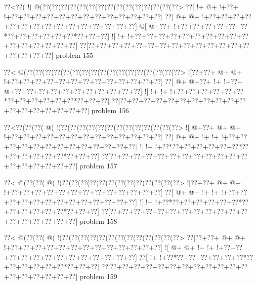 \vbox{\vbox{\goo
\0??<\0??(\- !(\- @(\0??(\0??(\0??(\0??(\0??(\0??(\0??(\0??(\0??(\0??(\0??(\0??(\0??(\0??(\0??>
\0??[\- !+\- @+\- !+\0??+\- !+\0??+\0??+\0??+\0??+\0??+\0??+\0??+\0??+\0??+\0??+\0??+\0??+\0??]
\0??[\- @+\- @+\- !+\0??+\0??+\0??+\0??+\0??+\0??+\0??+\0??+\0??+\0??+\0??+\0??+\0??+\0??+\0??]
\- @[\- @+\0??+\- !+\0??+\0??+\0??+\0??+\0??+\0??*\0??+\0??+\0??+\0??+\0??+\0??*\0??+\0??+\0??]
\- ![\- !+\- !+\0??+\0??+\0??+\0??+\0??+\0??+\0??+\0??+\0??+\0??+\0??+\0??+\0??+\0??+\0??+\0??]
\0??[\0??+\0??+\0??+\0??+\0??+\0??+\0??+\0??+\0??+\0??+\0??+\0??+\0??+\0??+\0??+\0??+\0??+\0??]
}
\hfil problem 155\hfil\break
}



\vbox{\vbox{\goo
\0??<\- @(\0??(\0??(\0??(\0??(\0??(\0??(\0??(\0??(\0??(\0??(\0??(\0??(\0??(\0??(\0??(\0??(\0??>
\- ![\0??+\0??+\- @+\- @+\- !+\0??+\0??+\0??+\0??+\0??+\0??+\0??+\0??+\0??+\0??+\0??+\0??+\0??]
\0??[\- @+\- @+\0??+\- !+\- !+\0??+\- @+\0??+\0??+\0??+\0??+\0??+\0??+\0??+\0??+\0??+\0??+\0??]
\- ![\- !+\- !+\- !+\0??+\0??+\0??+\0??+\0??+\0??*\0??+\0??+\0??+\0??+\0??+\0??*\0??+\0??+\0??]
\0??[\0??+\0??+\0??+\0??+\0??+\0??+\0??+\0??+\0??+\0??+\0??+\0??+\0??+\0??+\0??+\0??+\0??+\0??]
}
\hfil problem 156\hfil\break
}



\vbox{\vbox{\goo
\0??<\0??(\0??(\0??(\- @(\- !(\0??(\0??(\0??(\0??(\0??(\0??(\0??(\0??(\0??(\0??(\0??(\0??(\0??>
\- ![\- @+\0??+\- @+\- @+\- !+\0??+\0??+\0??+\0??+\0??+\0??+\0??+\0??+\0??+\0??+\0??+\0??+\0??]
\0??[\- @+\- @+\- !+\- !+\- !+\0??+\0??+\0??+\0??+\0??+\0??+\0??+\0??+\0??+\0??+\0??+\0??+\0??]
\- ![\- !+\- !+\0??*\0??+\0??+\0??+\0??+\0??+\0??*\0??+\0??+\0??+\0??+\0??+\0??*\0??+\0??+\0??]
\0??[\0??+\0??+\0??+\0??+\0??+\0??+\0??+\0??+\0??+\0??+\0??+\0??+\0??+\0??+\0??+\0??+\0??+\0??]
}
\hfil problem 157\hfil\break
}



\vbox{\vbox{\goo
\0??<\- @(\0??(\0??(\- @(\- !(\0??(\0??(\0??(\0??(\0??(\0??(\0??(\0??(\0??(\0??(\0??(\0??(\0??>
\- ![\0??+\0??+\- @+\- @+\- !+\0??+\0??+\0??+\0??+\0??+\0??+\0??+\0??+\0??+\0??+\0??+\0??+\0??]
\0??[\- @+\- @+\- !+\- !+\- !+\0??+\0??+\0??+\0??+\0??+\0??+\0??+\0??+\0??+\0??+\0??+\0??+\0??]
\- ![\- !+\- !+\0??*\0??+\0??+\0??+\0??+\0??+\0??*\0??+\0??+\0??+\0??+\0??+\0??*\0??+\0??+\0??]
\0??[\0??+\0??+\0??+\0??+\0??+\0??+\0??+\0??+\0??+\0??+\0??+\0??+\0??+\0??+\0??+\0??+\0??+\0??]
}
\hfil problem 158\hfil\break
}



\vbox{\vbox{\goo
\0??<\- @(\0??(\0??(\- @(\- !(\0??(\0??(\0??(\0??(\0??(\0??(\0??(\0??(\0??(\0??(\0??(\0??(\0??>
\0??[\0??+\0??+\- @+\- @+\- !+\0??+\0??+\0??+\0??+\0??+\0??+\0??+\0??+\0??+\0??+\0??+\0??+\0??]
\- ![\- @+\- @+\- !+\- !+\- !+\0??+\0??+\0??+\0??+\0??+\0??+\0??+\0??+\0??+\0??+\0??+\0??+\0??]
\0??[\- !+\- !+\0??*\0??+\0??+\0??+\0??+\0??+\0??*\0??+\0??+\0??+\0??+\0??+\0??*\0??+\0??+\0??]
\0??[\0??+\0??+\0??+\0??+\0??+\0??+\0??+\0??+\0??+\0??+\0??+\0??+\0??+\0??+\0??+\0??+\0??+\0??]
}
\hfil problem 159\hfil\break
}



